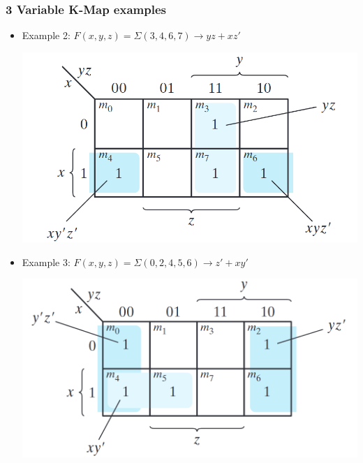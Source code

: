 \documentclass[Serif, 10pt, brown]{beamer}
\theoremstyle{example}
\theoremstyle{plain}
\begin{document}
\begin{frame}
	\frametitle{3 Variable K-Map examples}
	\transfly
	 \begin{itemize}
       \item Example 2: \( F(x,y,z) = \Sigma(3,4,6,7) \rightarrow yz + xz' \)
    \begin{center}
        \includegraphics[width=0.5\linewidth]{figs/3ex2.png}
    \end{center}
    \item Example 3: \( F(x,y,z) = \Sigma(0,2,4,5,6) \rightarrow z' + xy' \)
    \begin{center}
        \includegraphics[width=0.5\linewidth]{figs/3ex3.png}
    \end{center}
    \end{itemize}
	

\end{frame}
\end{document}

